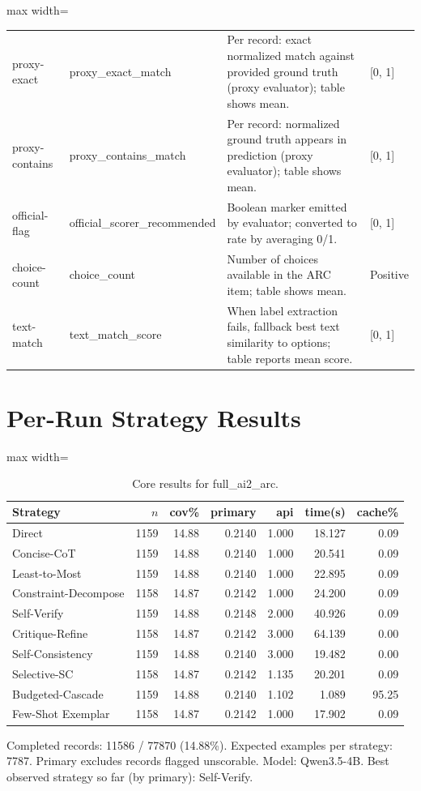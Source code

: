 \documentclass[10pt,twocolumn]{article}
\begin{document}
\begin{table}[t]
\begin{adjustbox}{max width=\textwidth}
\begin{tabular}{llll}
proxy-exact & proxy\_exact\_match & Per record: exact normalized match against provided ground truth (proxy evaluator); table shows mean. & [0, 1] \\
proxy-contains & proxy\_contains\_match & Per record: normalized ground truth appears in prediction (proxy evaluator); table shows mean. & [0, 1] \\
official-flag & official\_scorer\_recommended & Boolean marker emitted by evaluator; converted to rate by averaging 0/1. & [0, 1] \\
choice-count & choice\_count & Number of choices available in the ARC item; table shows mean. & Positive \\
text-match & text\_match\_score & When label extraction fails, fallback best text similarity to options; table reports mean score. & [0, 1] \\
\bottomrule
\end{tabular}
\end{adjustbox}
\end{table}

\section*{Per-Run Strategy Results}
\begin{table}[t]
\centering
\caption{Core results for full\_ai2\_arc.}
\label{tab:full_ai2_arc_core}
\begin{adjustbox}{max width=\textwidth}
\begin{tabular}{lrrrrrr}
\toprule
Strategy & $n$ & cov\% & primary & api & time(s) & cache\% \\
\midrule
Direct & 1159 & 14.88 & 0.2140 & 1.000 & 18.127 & 0.09 \\
Concise-CoT & 1159 & 14.88 & 0.2140 & 1.000 & 20.541 & 0.09 \\
Least-to-Most & 1159 & 14.88 & 0.2140 & 1.000 & 22.895 & 0.09 \\
Constraint-Decompose & 1158 & 14.87 & 0.2142 & 1.000 & 24.200 & 0.09 \\
Self-Verify & 1159 & 14.88 & 0.2148 & 2.000 & 40.926 & 0.09 \\
Critique-Refine & 1158 & 14.87 & 0.2142 & 3.000 & 64.139 & 0.00 \\
Self-Consistency & 1159 & 14.88 & 0.2140 & 3.000 & 19.482 & 0.00 \\
Selective-SC & 1158 & 14.87 & 0.2142 & 1.135 & 20.201 & 0.09 \\
Budgeted-Cascade & 1159 & 14.88 & 0.2140 & 1.102 & 1.089 & 95.25 \\
Few-Shot Exemplar & 1158 & 14.87 & 0.2142 & 1.000 & 17.902 & 0.09 \\
\bottomrule
\end{tabular}
\end{adjustbox}
\vspace{2pt}\parbox{0.98\textwidth}{\footnotesize Completed records: 11586 / 77870 (14.88\%). Expected examples per strategy: 7787. Primary excludes records flagged unscorable. Model: Qwen3.5-4B. Best observed strategy so far (by primary): Self-Verify.}
\end{table}
\end{document}
